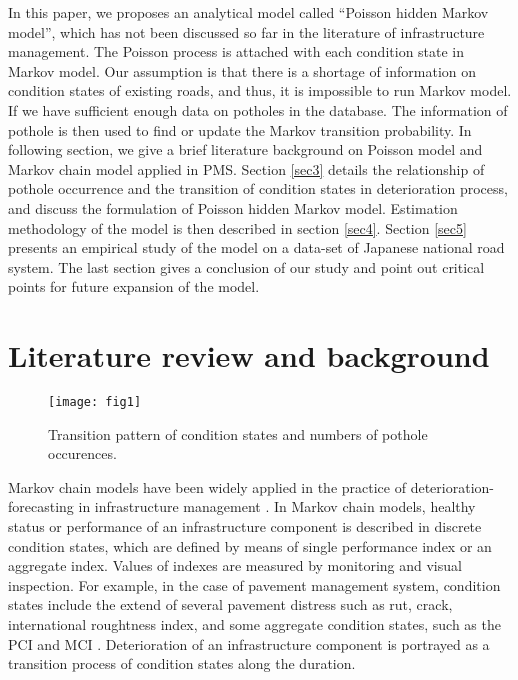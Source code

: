 \documentclass[a4paper,oneside,onecolumn,preprint,10pt,authoryear]{elsarticle}
\begin{document}
In this paper, we proposes an analytical model called ``Poisson hidden Markov model'', which has not been discussed so far in the literature of infrastructure management. The Poisson process is attached with each condition state in Markov model. Our assumption is that there is a shortage of information on condition states of existing roads, and thus, it is impossible to run Markov model. If we have sufficient enough data on potholes in the database. The information of pothole is then used to find or update the Markov transition probability. In following section, we give a brief literature background on Poisson model and Markov chain model applied in PMS. Section \ref{sec3} details the relationship of pothole occurrence and the transition of condition states in deterioration process, and discuss the formulation of Poisson hidden Markov model. Estimation methodology of the model is then described in section \ref{sec4}. Section \ref{sec5} presents an empirical study of the model on a data-set of Japanese national road system. The last section gives a conclusion of our study and point out critical points for future expansion of the model.
\section{Literature review and background}
\label{sec2}
\begin{figure}
\begin{center}
\begin{footnotesize}
\texttt{[image: fig1]}\\
\end{footnotesize}
\end{center}
\caption{Transition pattern of condition states and numbers of pothole occurences.}
\label{fig1}
\end{figure}
Markov chain models have been widely applied in the practice of deterioration-forecasting in infrastructure management \citep{Nakat2008,Shin2003,kobayashitsuda}. In Markov chain models, healthy status or performance of an infrastructure component is described in discrete condition states, which are defined by means of single performance index or an aggregate index. Values of indexes are measured by monitoring and visual inspection. For example, in the case of pavement management system, condition states include the extend of several pavement distress such as rut, crack, international roughtness index, and some aggregate condition states, such as the PCI and MCI \citep{shahin05,Nam2009}. Deterioration of an infrastructure component is portrayed as a transition process of condition states along the duration.
\end{document}
